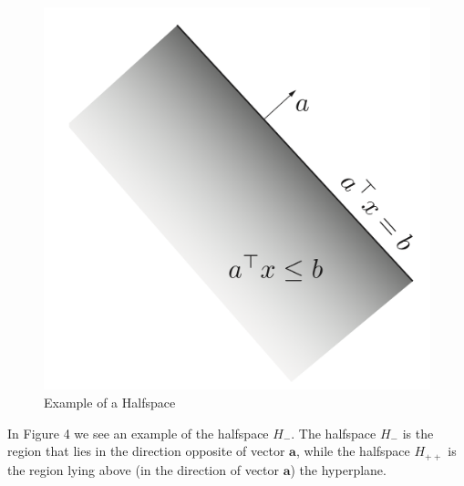 \documentclass[12pt]{article}
\begin{document}
  \begin{figure}[h!]\begin{center}\includegraphics[scale=0.2]{figures/halfspace}\caption{Example of a Halfspace}\end{center}\end{figure}

\noindent In Figure 4 we see an example of the halfspace $H_{-}$. The halfspace $H_{-}$ is the region that lies in the direction opposite of vector $\mathbf{a}$, while the halfspace $H_{++}$ is the region lying above (in the direction of vector $\mathbf{a}$) the hyperplane. 
\end{document}
